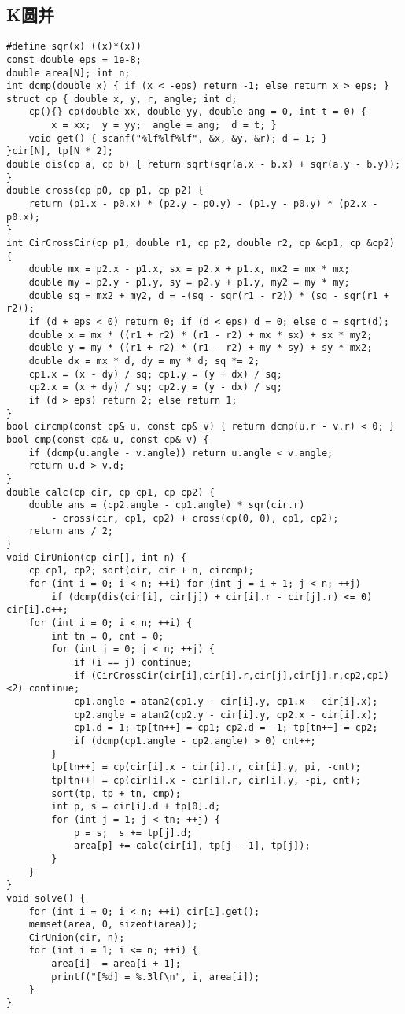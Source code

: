 \documentclass[landscape,a4paper]{article}
\begin{document}
\subsection{K圆并}
\begin{lstlisting}
#define sqr(x) ((x)*(x))
const double eps = 1e-8;
double area[N]; int n;
int dcmp(double x) { if (x < -eps) return -1; else return x > eps; }
struct cp { double x, y, r, angle; int d;
	cp(){} cp(double xx, double yy, double ang = 0, int t = 0) {
		x = xx;  y = yy;  angle = ang;  d = t; }
	void get() { scanf("%lf%lf%lf", &x, &y, &r); d = 1; }
}cir[N], tp[N * 2];
double dis(cp a, cp b) { return sqrt(sqr(a.x - b.x) + sqr(a.y - b.y)); }
double cross(cp p0, cp p1, cp p2) {
	return (p1.x - p0.x) * (p2.y - p0.y) - (p1.y - p0.y) * (p2.x - p0.x); 
}
int CirCrossCir(cp p1, double r1, cp p2, double r2, cp &cp1, cp &cp2) {
    double mx = p2.x - p1.x, sx = p2.x + p1.x, mx2 = mx * mx;
    double my = p2.y - p1.y, sy = p2.y + p1.y, my2 = my * my;
    double sq = mx2 + my2, d = -(sq - sqr(r1 - r2)) * (sq - sqr(r1 + r2));
    if (d + eps < 0) return 0; if (d < eps) d = 0; else d = sqrt(d);
    double x = mx * ((r1 + r2) * (r1 - r2) + mx * sx) + sx * my2;
    double y = my * ((r1 + r2) * (r1 - r2) + my * sy) + sy * mx2;
    double dx = mx * d, dy = my * d; sq *= 2;
    cp1.x = (x - dy) / sq; cp1.y = (y + dx) / sq;
    cp2.x = (x + dy) / sq; cp2.y = (y - dx) / sq;
    if (d > eps) return 2; else return 1;
}
bool circmp(const cp& u, const cp& v) { return dcmp(u.r - v.r) < 0; }
bool cmp(const cp& u, const cp& v) {
    if (dcmp(u.angle - v.angle)) return u.angle < v.angle;
    return u.d > v.d;
}
double calc(cp cir, cp cp1, cp cp2) {
    double ans = (cp2.angle - cp1.angle) * sqr(cir.r)
        - cross(cir, cp1, cp2) + cross(cp(0, 0), cp1, cp2);
    return ans / 2;
}
void CirUnion(cp cir[], int n) {
    cp cp1, cp2; sort(cir, cir + n, circmp);
    for (int i = 0; i < n; ++i) for (int j = i + 1; j < n; ++j)
        if (dcmp(dis(cir[i], cir[j]) + cir[i].r - cir[j].r) <= 0) cir[i].d++;
	for (int i = 0; i < n; ++i) {
		int tn = 0, cnt = 0;
		for (int j = 0; j < n; ++j) {
			if (i == j) continue;
            if (CirCrossCir(cir[i],cir[i].r,cir[j],cir[j].r,cp2,cp1)<2) continue;
            cp1.angle = atan2(cp1.y - cir[i].y, cp1.x - cir[i].x);
            cp2.angle = atan2(cp2.y - cir[i].y, cp2.x - cir[i].x);
            cp1.d = 1; tp[tn++] = cp1; cp2.d = -1; tp[tn++] = cp2;
            if (dcmp(cp1.angle - cp2.angle) > 0) cnt++;
        }
        tp[tn++] = cp(cir[i].x - cir[i].r, cir[i].y, pi, -cnt);
        tp[tn++] = cp(cir[i].x - cir[i].r, cir[i].y, -pi, cnt);
        sort(tp, tp + tn, cmp);
        int p, s = cir[i].d + tp[0].d;
        for (int j = 1; j < tn; ++j) {
            p = s;  s += tp[j].d;
            area[p] += calc(cir[i], tp[j - 1], tp[j]);
        }
    }
}
void solve() {
    for (int i = 0; i < n; ++i) cir[i].get();
    memset(area, 0, sizeof(area));
    CirUnion(cir, n);
    for (int i = 1; i <= n; ++i) {
        area[i] -= area[i + 1];
        printf("[%d] = %.3lf\n", i, area[i]);
    }
}
\end{lstlisting}
\end{document}
